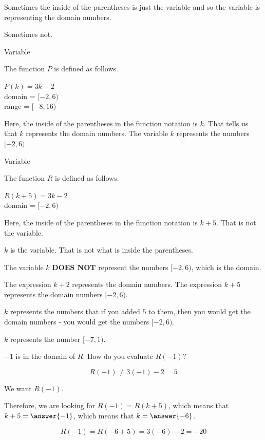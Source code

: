 \documentclass{ximera}
\begin{document}
Sometimes the inside of the parentheses is just the variable and so the variable is representing the domain numbers. 

Sometimes not. 


\begin{example} Variable

The function $P$ is defined as follows.

$P(k) = 3k - 2$ \\
domain = $[-2, 6)$ \\
range = $[-8, 16)$ 


Here, the inside of the parentheses in the function notation is $k$.  That tells us that $k$ represents the domain numbers.  The variable $k$ represents the numbers $[-2, 6)$.


\end{example}






\begin{example} Variable

The function $R$ is defined as follows.

$R(k + 5) = 3k - 2$ \\
domain = $[-2, 6)$ 


Here, the inside of the parentheses in the function notation is $k + 5$.  That is not the variable. 


$k$ is the variable.  That is not what is inside the parentheses.


The variable $k$ \textbf{DOES NOT} represent the numbers $[-2, 6)$, which is the domain. 


The expression $k + 2$ represents the domain numbers.   The expression $k + 5$ represents the domain numbers $[-2, 6)$. 


$k$ represents the numbers that if you added $5$ to them, then you would get the domain numbers - you would get the numbers $[-2, 6)$.


$k$ represents the number $[-7, 1)$.



\begin{question}


$-1$ is in the domain of $R$. How do you evaluate $R(-1)$? 

\[
R(-1) \ne 3 (-1) - 2 = 5
\]



We want $R(-1)$. 

Therefore, we are looking for $R(-1) = R(k + 5)$, which means that $k + 5 = \answer{-1}$, which means that $k = \answer{-6}$.


\[
R(-1) = R(-6 + 5) = 3(-6) - 2 = -20
\]



\end{question}

\end{example}
\end{document}
